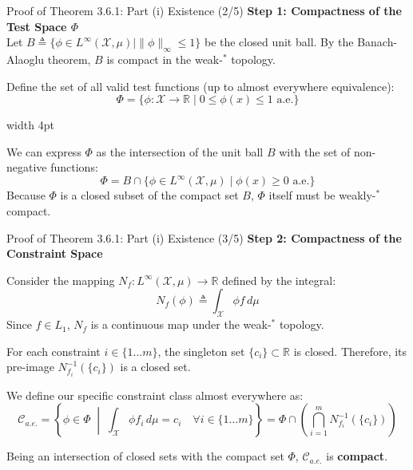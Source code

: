 \documentclass[10pt, aspectratio=169, xcolor=dvipsnames]{beamer}
\newcommand{\lead}[1]{{\color{UniBlue}\bfseries #1}}
\begin{document}
\begin{frame}{Proof of Theorem 3.6.1: Part (i) Existence (2/5)}
    \lead{Step 1: Compactness of the Test Space $\Phi$}\\
    \vspace{0.2cm}
    Let $B \triangleq \{ \phi \in L^\infty(\mathcal{X}, \mu) \mid \|\phi\|_\infty \le 1 \}$ be the closed unit ball. By the Banach-Alaoglu theorem, $B$ is compact in the weak-$^\ast$ topology.
    
    \vspace{0.4cm}
    Define the set of all valid test functions (up to almost everywhere equivalence):
    \[ \Phi = \{ \phi : \mathcal{X} \to \mathbb{R} \mid 0 \le \phi(x) \le 1 \text{ a.e.} \} \]
    
    \vspace{0.3cm}
    \noindent
    {\color{Teal}\vrule width 4pt}%
    \hspace{10pt}%
    \begin{minipage}{\dimexpr\textwidth-14pt\relax}
        \color{Slate}
        We can express $\Phi$ as the intersection of the unit ball $B$ with the set of non-negative functions:
        \[ \Phi = B \cap \{ \phi \in L^\infty(\mathcal{X}, \mu) \mid \phi(x) \ge 0 \text{ a.e.} \} \]
        Because $\Phi$ is a closed subset of the compact set $B$, $\Phi$ itself must be weakly-$^\ast$ compact.
    \end{minipage}
\end{frame}

\begin{frame}{Proof of Theorem 3.6.1: Part (i) Existence (3/5)}
    \lead{Step 2: Compactness of the Constraint Space}
    
    \vspace{0.1cm}
    Consider the mapping $N_f : L^\infty(\mathcal{X}, \mu) \to \mathbb{R}$ defined by the integral:
    \[ N_f(\phi) \triangleq \int_{\mathcal{X}} \phi f \, d\mu \]
    Since $f \in L_1$, $N_f$ is a continuous map under the weak-$^\ast$ topology.
    
    \vspace{0.2cm}
    For each constraint $i \in \{1 \dots m\}$, the singleton set $\{c_i\} \subset \mathbb{R}$ is closed. Therefore, its pre-image $N_{f_i}^{-1}(\{c_i\})$ is a closed set.
    
    \vspace{0.2cm}
    We define our specific constraint class almost everywhere as:
    \[ \mathcal{C}_{a.e.} = \left\{ \phi \in \Phi \;\middle|\; \int_{\mathcal{X}} \phi f_i \, d\mu = c_i \quad \forall i \in \{1 \dots m\} \right\} = \Phi \cap \left( \bigcap_{i=1}^m N_{f_i}^{-1}(\{c_i\}) \right) \]
    
    \vspace{0.1cm}
    Being an intersection of closed sets with the compact set $\Phi$, $\mathcal{C}_{a.e.}$ is \textbf{compact}.
\end{frame}
\end{document}
